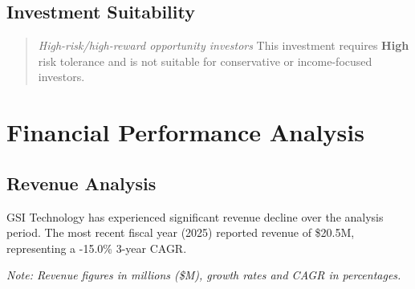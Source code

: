 \documentclass[11pt,a4paper]{article}
\begin{document}
\vspace{0.5cm}

\subsection{Investment Suitability}

\begin{quote}
\textit{High-risk/high-reward opportunity investors} This investment requires \textbf{High} risk tolerance and is not suitable for conservative or income-focused investors.
\end{quote}


\newpage

\section{Financial Performance Analysis}

\subsection{Revenue Analysis}

GSI Technology has experienced significant revenue decline over the analysis period. The most recent fiscal year (2025) reported revenue of \$20.5M, representing a -15.0\% 3-year CAGR.

\small{\textit{Note: Revenue figures in millions (\$M), growth rates and CAGR in percentages.}}


\begin{table}[H]
\centering
\caption{Revenue Growth Metrics (Recent 8 Years)}
\label{tab:revenue_growth}
\end{table}
\end{document}
